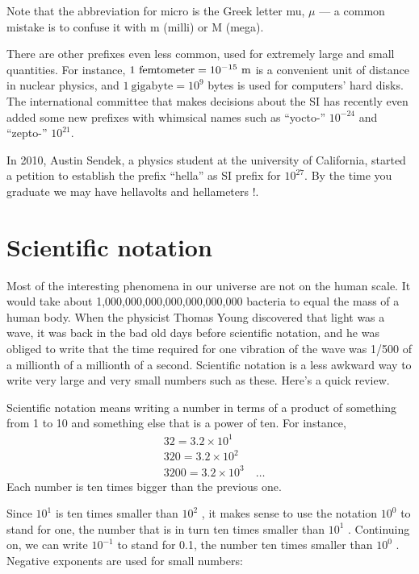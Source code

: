 Note that the abbreviation for micro is the Greek letter mu,
$\mu$ --- a common mistake is to confuse it with m
(milli) or M (mega).

There are other prefixes even less common, used for
extremely large and small quantities.  For instance,
$1\ \text{femtometer}=10^{-15}\ \munit$ is a convenient unit of distance in
nuclear physics, and $1\ \text{gigabyte}=10^9$  bytes is used for
computers' hard disks.  The international committee that
makes decisions about the SI has recently even added some
new prefixes with whimsical names such as  ``yocto-'' $10^{-24}$ and ``zepto-'' $10^{21}$. 

In 2010, Austin Sendek, a physics student at the university of California,  started a petition to establish the prefix ``hella''  as SI prefix for $10^{27}$.  By the time you graduate we may have hellavolts and hellameters !.

\section{Scientific notation}\label{sec:scientific-notation}


Most of the interesting phenomena in our universe
are not on the human scale. It would take about 1,000,000,000,000,000,000,000
bacteria to equal the mass of a human body. When the
physicist Thomas Young discovered that light was a wave, it
was back in the bad old days before scientific notation, and
he was obliged to write that the time required for one
vibration of the wave was 1/500 of a millionth of a
millionth of a second. Scientific notation is a less awkward
way to write very large and very small numbers such as
these.  Here's a quick review.

Scientific notation means writing a number in terms of a
product of something from 1 to 10 and something else that is
a power of ten. For instance,
\begin{align*}
& 32 = 3.2 \times 10^1\\
& 320 =  3.2 \times 10^2\\
& 3200 = 3.2 \times 10^3  \quad\ldots
\end{align*}
Each number is ten times bigger than the previous one.

Since $10^1$  is ten times smaller than $10^2$ , it makes
sense to use the notation $10^0$  to stand for one, the
number that is in turn ten times smaller than $10^1$ .
Continuing on, we can write $10^{-1}$  to stand for 0.1, the
number ten times smaller than $10^0$ . Negative exponents
are used for small numbers:

